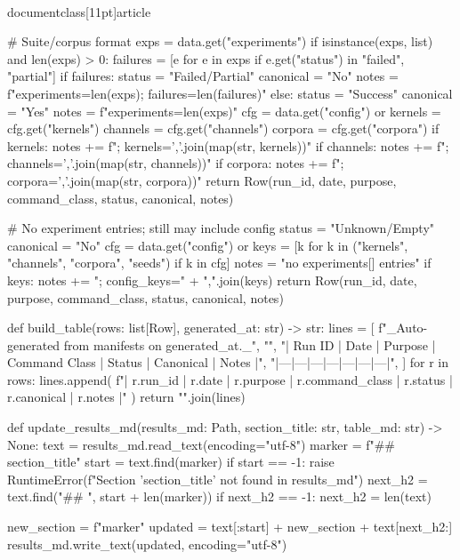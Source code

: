 \\documentclass[11pt]{article}
\begin{document}
\begin{CodeBlock}
    # Suite/corpus format
    exps = data.get("experiments")
    if isinstance(exps, list) and len(exps) > 0:
        failures = [e for e in exps if e.get("status") in {"failed", "partial"}]
        if failures:
            status = "Failed/Partial"
            canonical = "No"
            notes = f"experiments={len(exps)}; failures={len(failures)}"
        else:
            status = "Success"
            canonical = "Yes"
            notes = f"experiments={len(exps)}"
        cfg = data.get("config") or {}
        kernels = cfg.get("kernels")
        channels = cfg.get("channels")
        corpora = cfg.get("corpora")
        if kernels:
            notes += f"; kernels={','.join(map(str, kernels))}"
        if channels:
            notes += f"; channels={','.join(map(str, channels))}"
        if corpora:
            notes += f"; corpora={','.join(map(str, corpora))}"
        return Row(run_id, date, purpose, command_class, status, canonical, notes)

    # No experiment entries; still may include config
    status = "Unknown/Empty"
    canonical = "No"
    cfg = data.get("config") or {}
    keys = [k for k in ("kernels", "channels", "corpora", "seeds") if k in cfg]
    notes = "no experiments[] entries"
    if keys:
        notes += "; config_keys=" + ",".join(keys)
    return Row(run_id, date, purpose, command_class, status, canonical, notes)


def build_table(rows: list[Row], generated_at: str) -> str:
    lines = [
        f"_Auto-generated from manifests on {generated_at}._",
        "",
        "| Run ID | Date | Purpose | Command Class | Status | Canonical | Notes |",
        "|---|---|---|---|---|---|---|",
    ]
    for r in rows:
        lines.append(
            f"| {r.run_id} | {r.date} | {r.purpose} | {r.command_class} | {r.status} | {r.canonical} | {r.notes} |"
        )
    return "\n".join(lines)


def update_results_md(results_md: Path, section_title: str, table_md: str) -> None:
    text = results_md.read_text(encoding="utf-8")
    marker = f"## {section_title}"
    start = text.find(marker)
    if start == -1:
        raise RuntimeError(f"Section '{section_title}' not found in {results_md}")
    next_h2 = text.find("\n## ", start + len(marker))
    if next_h2 == -1:
        next_h2 = len(text)

    new_section = f"{marker}\n{}\n"
    updated = text[:start] + new_section + text[next_h2:]
    results_md.write_text(updated, encoding="utf-8")



\end{CodeBlock}
\end{document}
